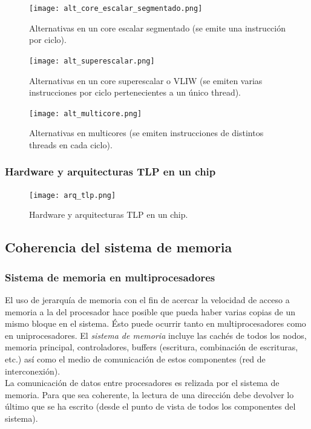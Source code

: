 \documentclass[12pt,spanish]{article}
\begin{document}
\begin{figure}[H]
\centering
\texttt{[image: alt\_core\_escalar\_segmentado.png]}
\caption{Alternativas en un core escalar segmentado (se emite una instrucción por ciclo).}
\end{figure}

\begin{figure}[H]
\centering
\texttt{[image: alt\_superescalar.png]}
\caption{Alternativas en un core superescalar o VLIW (se emiten varias instrucciones por ciclo pertenecientes a un único thread).}
\end{figure}

\begin{figure}[H]
\centering
\texttt{[image: alt\_multicore.png]}
\caption{Alternativas en multicores (se emiten instrucciones de distintos threads en cada ciclo).}
\end{figure}


\subsubsection{Hardware y arquitecturas TLP en un chip}

\begin{figure}[H]
\centering
\texttt{[image: arq\_tlp.png]}
\caption{Hardware y arquitecturas TLP en un chip.}
\end{figure}

\subsection{Coherencia del sistema de memoria}


\subsubsection{Sistema de memoria en multiprocesadores}

El uso de jerarquía de memoria con el fin de acercar la velocidad de acceso a memoria a la del procesador hace posible que pueda haber varias  copias de un mismo bloque en el sistema. Ésto puede ocurrir tanto en multiprocesadores como en uniprocesadores. El \emph{sistema de memoria} incluye las cachés de todos los nodos, memoria principal, controladores, buffers (escritura, combinación de escrituras, etc.) así como el medio de comunicación de estos componentes (red de interconexión).\\

La comunicación de datos entre procesadores es relizada por el sistema de memoria. Para que sea coherente, la lectura de una dirección debe devolver lo último que se ha escrito (desde el punto de vista de todos los componentes del sistema).
\end{document}
